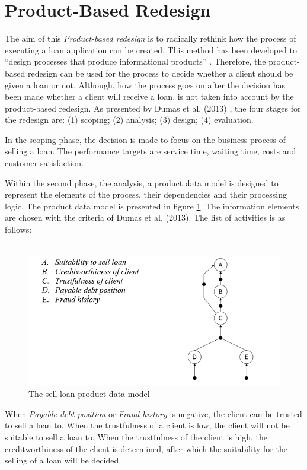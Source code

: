 \documentclass[a4paper]{article} %
\begin{document}
\section{Product-Based Redesign}
The aim of this \textit{Product-based redesign} is to radically rethink how the process of executing a loan application can be created. This method has been developed to “design processes that produce informational products” \cite{dumas2013}. Therefore, the product-based redesign can be used for the process to decide whether a client should be given a loan or not. Although, how the process goes on after the decision has been made whether a client will receive a loan, is not taken into account by the product-based redesign. As presented by Dumas et al. (2013) \cite{dumas2013}, the four stages for the redesign are: (1) scoping; (2) analysis; (3) design; (4) evaluation. 

In the scoping phase, the decision is made to focus on the business process of selling a loan. The performance targets are service time, waiting time, costs and customer satisfaction. 

Within the second phase, the analysis, a product data model is designed to represent the elements of the process, their dependencies and their processing logic. The product data model is presented in figure \ref{PDM1}. The information elements are chosen with the criteria of Dumas et al. (2013)\cite{dumas2013}. The list of activities is as follows:\\\\

\begin{figure}[H]
\centering
\includegraphics[scale=0.8, frame]{PDM1}
\caption{The sell loan product data model}
\label{PDM1}
\end{figure}
When \textit{Payable debt position} or \textit{Fraud history} is negative, the client can be trusted to sell a loan to. When the trustfulness of a client is low, the client will not be suitable to sell a loan to. When the trustfulness of the client is high, the creditworthiness of the client is determined, after which the suitability for the selling of a loan will be decided.
\end{document}
